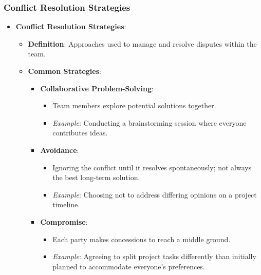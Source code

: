 \documentclass[aspectratio=169]{beamer}
\begin{document}
\begin{frame}[fragile]
    \frametitle{Conflict Resolution Strategies}
    \begin{itemize}
        \item \textbf{Conflict Resolution Strategies}:
        \begin{itemize}
            \item \textbf{Definition}: Approaches used to manage and resolve disputes within the team.
            \item \textbf{Common Strategies}:
            \begin{itemize}
                \item \textbf{Collaborative Problem-Solving}:
                \begin{itemize}
                    \item Team members explore potential solutions together.
                    \item \textit{Example}: Conducting a brainstorming session where everyone contributes ideas.
                \end{itemize}
                \item \textbf{Avoidance}:
                \begin{itemize}
                    \item Ignoring the conflict until it resolves spontaneously; not always the best long-term solution.
                    \item \textit{Example}: Choosing not to address differing opinions on a project timeline.
                \end{itemize}
                \item \textbf{Compromise}:
                \begin{itemize}
                    \item Each party makes concessions to reach a middle ground.
                    \item \textit{Example}: Agreeing to split project tasks differently than initially planned to accommodate everyone's preferences.
                \end{itemize}
            \end{itemize}
        \end{itemize}
    \end{itemize}
\end{frame}
\end{document}
